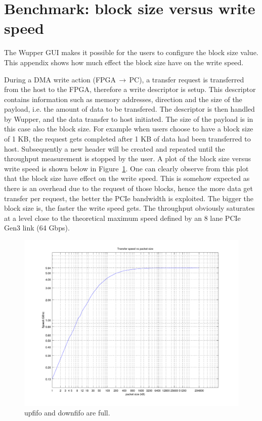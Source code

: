 

\section{Benchmark: block size versus write speed}
\label{sec:blocksize}
The Wupper GUI makes it possible for the users to configure the block size value. This appendix shows how much effect the block size have on the write speed. 

During a DMA write action (FPGA$\,\to\,$PC), a transfer request is transferred from the host to the FPGA, therefore a write descriptor is setup. This descriptor contains information such as memory addresses, direction and the size of the payload, i.e. the amount of data to be transfered. The descriptor is then handled by Wupper, and the data transfer to host initiated. The size of the payload is in this case also the block size. For example when users choose to have a block size of 1 KB, the request gets completed after 1 KB of data had been transferred to host. Subsequently a new header will be created and repeated until the throughput measurement is stopped by the user. 
A plot of the block size versus write speed is shown below in Figure~\ref{fig:blocksizeplot}. One can clearly observe from this plot that the block size have effect on the write speed. This is somehow expected as there is an overhead due to the request of those blocks, hence the more data get transfer per request, the better the PCIe bandwidth is exploited. The bigger the block size is, the faster the write speed gets. The throughput obviously saturates at a level close to the theoretical maximum speed defined by an 8 lane PCIe Gen3 link (64 Gbps).

\begin{figure}[h]
	
	\centering
	\includegraphics[width = 1 \textwidth]{figures/blocksize_plot.pdf}	
	\caption{upfifo and downfifo are full.}
	\label{fig:blocksizeplot}
\end{figure}


